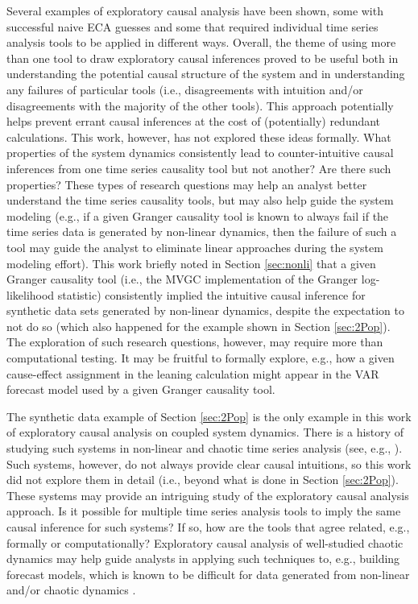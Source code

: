 Several examples of exploratory causal analysis have been shown, some with successful naive ECA guesses and some that required individual time series analysis tools to be applied in different ways.  Overall, the theme of using more than one tool to draw exploratory causal inferences proved to be useful both in understanding the potential causal structure of the system and in understanding any failures of particular tools (i.e., disagreements with intuition and/or disagreements with the majority of the other tools).  This approach potentially helps prevent errant causal inferences at the cost of (potentially) redundant calculations.  This work, however, has not explored these ideas formally.  What properties of the system dynamics consistently lead to counter-intuitive causal inferences from one time series causality tool but not another?  Are there such properties?  These types of research questions may help an analyst better understand the time series causality tools, but may also help guide the system modeling (e.g., if a given Granger causality tool is known to always fail if the time series data is generated by non-linear dynamics, then the failure of such a tool may guide the analyst to eliminate linear approaches during the system modeling effort).  This work briefly noted in Section \ref{sec:nonli} that a given Granger causality tool (i.e., the MVGC implementation of the Granger log-likelihood statistic) consistently implied the intuitive causal inference for synthetic data sets generated by non-linear dynamics, despite the expectation to not do so (which also happened for the example shown in Section \ref{sec:2Pop}).  The exploration of such research questions, however, may require more than computational testing.  It may be fruitful to formally explore, e.g., how a given cause-effect assignment in the leaning calculation might appear in the VAR forecast model used by a given Granger causality tool.

The synthetic data example of Section \ref{sec:2Pop} is the only example in this work of exploratory causal analysis on coupled system dynamics.  There is a history of studying such systems in non-linear and chaotic time series analysis (see, e.g., \cite{ITbook_placeholder}).  Such systems, however, do not always provide clear causal intuitions, so this work did not explore them in detail (i.e., beyond what is done in Section \ref{sec:2Pop}).  These systems may provide an intriguing study of the exploratory causal analysis approach.  Is it possible for multiple time series analysis tools to imply the same causal inference for such systems?  If so, how are the tools that agree related, e.g., formally or computationally?  Exploratory causal analysis of well-studied chaotic dynamics may help guide analysts in applying such techniques to, e.g., building forecast models, which is known to be difficult for data generated from non-linear and/or chaotic dynamics \cite{Tong1993}.

